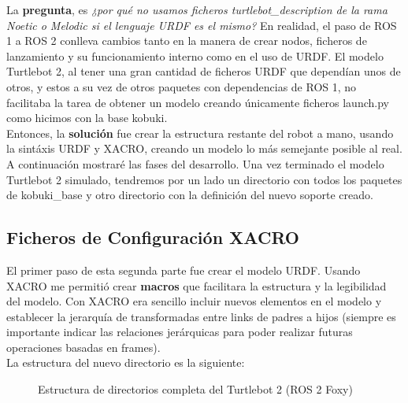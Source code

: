La \textbf{pregunta}, es \textit{¿por qué no usamos ficheros turtlebot\_description de la rama Noetic o Melodic si el lenguaje URDF es el mismo?} En realidad, el paso de ROS 1 a ROS 2 conlleva cambios tanto en la manera de crear nodos, ficheros de lanzamiento y su funcionamiento interno como en el uso de URDF. El modelo Turtlebot 2, al tener una gran cantidad de ficheros URDF que dependían unos de otros, y estos a su vez de otros paquetes con dependencias de ROS 1, no facilitaba la tarea de obtener un modelo creando únicamente ficheros launch.py como hicimos con la base kobuki.\\

Entonces, la \textbf{solución} fue crear la estructura restante del robot a mano, usando la sintáxis URDF y XACRO, creando un modelo lo más semejante posible al real. A continuación mostraré las fases del desarrollo. Una vez terminado el modelo Turtlebot 2 simulado, tendremos por un lado un directorio con todos los paquetes de kobuki\_base y otro directorio con la definición del nuevo soporte creado.\\



\subsection{Ficheros de Configuración XACRO}
\label{subsec:turtlebot2_xacro}

El primer paso de esta segunda parte fue crear el modelo URDF. Usando XACRO me permitió crear \textbf{macros} que facilitara la estructura y la legibilidad del modelo. Con XACRO era sencillo incluir nuevos elementos en el modelo y establecer la jerarquía de transformadas entre links de padres a hijos (siempre es importante indicar las relaciones jerárquicas para poder realizar futuras operaciones basadas en frames).\\

La estructura del nuevo directorio es la siguiente:
\begin{figure}[H]
	\begin{center}
	    \setlength{\fboxsep}{0.5cm}
	    \caption{Estructura de directorios completa del Turtlebot 2 (ROS 2 Foxy)}
	    \label{fig:directorios_turtlebot2}
	\end{center}
\end{figure}\

